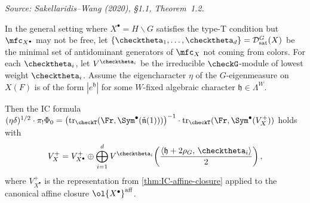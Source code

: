 \begin{theorem}
  \label{thm:IC-general}
  \textit{Source: Sakellaridis--Wang (2020), §1.1, Theorem~1.2.}

  In the general setting where \( X^\bullet = H \backslash G \) satisfies the type-T
  condition but \( \mfc_{X^\bullet} \) may not be free, let
  \( \{\checktheta_1, \ldots, \checktheta_d\} = \mathcal{D}^G_{\mathrm{sat}}(X) \)
  be the minimal set of antidominant generators of \( \mfc_X \) not coming from colors.
  For each \( \checktheta_i \), let \( V^{\checktheta_i} \) be the irreducible
  \( \checkG \)-module of lowest weight \( \checktheta_i \).
  Assume the eigencharacter \( \eta \) of the \( G \)-eigenmeasure on \( X(F) \) is of the
  form \( |e^{\mathfrak{h}}| \) for some \( W \)-fixed algebraic character
  \( \mathfrak{h} \in \Lambda^W \).

  Then the IC formula
  \( (\eta\delta)^{1/2} \cdot \pi_!\Phi_0
     = \bigl(\mathrm{tr}_{\checkT}(\Fr, \Sym^\bullet(\check{\mathfrak{n}}(1)))\bigr)^{-1}
       \cdot \mathrm{tr}_{\checkT}(\Fr, \Sym^\bullet(V_X^+)) \)
  holds with
  \[
    V_X^+
    = V_{X^\bullet}^+
      \oplus \bigoplus_{i=1}^d
        V^{\checktheta_i}\!\left(
          \frac{\langle \mathfrak{h} + 2\rho_G,\, \checktheta_i \rangle}{2}
        \right),
  \]
  where \( V_{X^\bullet}^+ \) is the representation from
  \cref{thm:IC-affine-closure} applied to the canonical affine closure
  \( \ol{X^\bullet}^{\mathrm{aff}} \).
\end{theorem}


